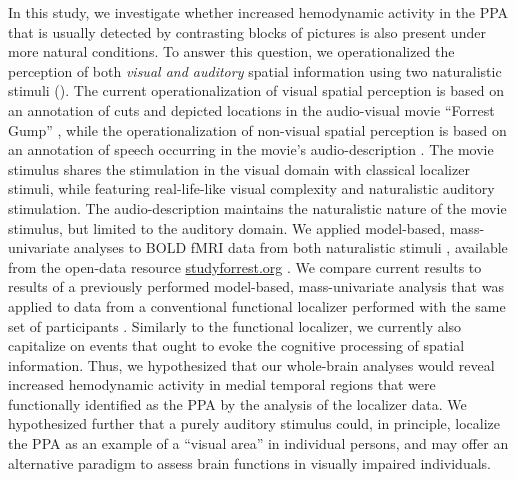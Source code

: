 \documentclass[english,11pt]{article}
\begin{document}
In this study, we investigate whether increased hemodynamic activity in the PPA
that is usually detected by contrasting blocks of pictures is also present under
more natural conditions.
To answer this question, we operationalized the perception of both
\textit{visual and auditory} spatial information using two naturalistic stimuli
(\citep[see reviews][]{hamilton2018revolution, hasson2008neurocinematics,
sonkusare2019naturalistic}).
The current operationalization of visual spatial perception is based on an
annotation of cuts and depicted locations in the audio-visual movie ``Forrest
Gump'' \citep{haeusler2016cutanno}, while
the operationalization of non-visual spatial perception is based on an
annotation of speech occurring in the movie's audio-description
\citep{haeusler2021studyforrest}.
The movie stimulus shares the stimulation in the visual domain with classical
localizer stimuli, while featuring real-life-like visual complexity and
naturalistic auditory stimulation. The audio-description maintains the
naturalistic nature of the movie stimulus, but limited to the auditory domain.
We applied model-based, mass-univariate analyses to BOLD fMRI data from both
naturalistic stimuli \citep{hanke2016simultaneous, hanke2014audiomovie},
available from the open-data resource
\href{http://www.studyforrest.org}{studyforrest.org} \citep{hanke2016aligned}.
We compare current results to results of a previously performed model-based,
mass-univariate analysis that was applied to data from a conventional functional
localizer performed with the same set of participants
\citep{sengupta2016extension, sengupta2016extensiondata}.
Similarly to the functional localizer, we currently also capitalize on events
that ought to evoke the cognitive processing of spatial information.
Thus, we hypothesized that our whole-brain analyses would reveal increased
hemodynamic activity in medial temporal regions that were functionally
identified as the PPA by the analysis of the localizer data.
We hypothesized further that a purely auditory stimulus could, in principle,
localize the PPA as an example of a ``visual area'' in individual persons,
and may offer an alternative paradigm to assess brain functions in visually
impaired individuals.
\end{document}
